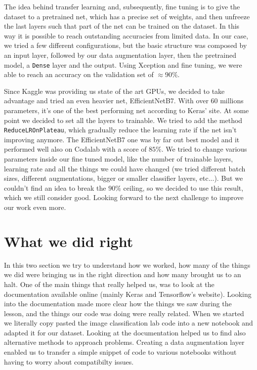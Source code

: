 \documentclass[a4paper,11pt]{article}
\newcommand{\code}[1]{\texttt{#1}}
\numberwithin{equation}{section}
\begin{document}
The idea behind transfer learning and, subsequently, fine tuning is to give the dataset to a pretrained net, which has a precise set of weights, and then unfreeze the last layers such that part of the net can be trained on the dataset. In this way it is possible to reach outstanding accuracies from limited data. In our case, we tried a few different configurations, but the basic structure was composed by an input layer, followed by our data augmentation layer, then the pretrained model, a \code{Dense} layer and the output. Using Xception and fine tuning, we were able to reach an accuracy on the validation set of \(\approx 90\%\). 

Since Kaggle was providing us state of the art GPUs, we decided to take advantage and tried an even heavier net, EfficientNetB7. With over \(60\) millions parameters, it's one of the best performing net according to Keras' site. At some point we decided to set all the layers to trainable. We tried to add the method \code{ReduceLROnPlateau}, which gradually reduce the learning rate if the net isn't improving anymore. The EfficientNetB7 one was by far out best model and it performed well also on Codalab with a score of \(85\%\). We tried to change various parameters inside our fine tuned model, like the number of trainable layers, learning rate and all the things we could have changed (we tried different batch sizes, different augmentations, bigger or smaller classifier layers, etc...). But we couldn't find an idea to break the \(90\%\) ceiling, so we decided to use this result, which we still consider good. Looking forward to the next challenge to improve our work even more.
\section*{What we did right}
In this two section we try to understand how we worked, how many of the things we did were bringing us in the right direction and how many brought us to an halt. One of the main things that really helped us, was to look at the documentation available online (mainly Keras and Tensorflow's website). Looking into the documentation made more clear how the things we saw during the lesson, and the things our code was doing were really related. When we started we literally copy pasted the image classification lab code into a new notebook and adapted it for our dataset. Looking at the documentation helped us to find also alternative methods to approach problems. Creating a data augmentation layer enabled us to transfer a simple snippet of code to various notebooks without having to worry about compatibilty issues. 
\end{document}
